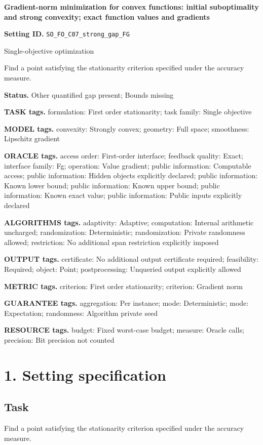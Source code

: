 \documentclass[10pt,a4paper]{article}
\begin{document}
\raggedright

{\LARGE\bfseries\sffamily\color{AtlasNavy} Gradient-norm minimization for convex functions: initial suboptimality and strong convexity; exact function values and gradients\par}\vspace{5pt}
\textbf{Setting ID.} \texttt{SO\_\allowbreak{}FO\_\allowbreak{}C07\_\allowbreak{}strong\_\allowbreak{}gap\_\allowbreak{}FG}

Single-objective optimization

Find a point satisfying the stationarity criterion specified under the accuracy measure.

\textbf{Status.} Other quantified gap present; Bounds missing

\textbf{TASK tags.} formulation: First order stationarity; task family: Single objective

\textbf{MODEL tags.} convexity: Strongly convex; geometry: Full space; smoothness: Lipschitz gradient

\textbf{ORACLE tags.} access order: First-order interface; feedback quality: Exact; interface family: Fg; operation: Value gradient; public information: Computable access; public information: Hidden objects explicitly declared; public information: Known lower bound; public information: Known upper bound; public information: Known exact value; public information: Public inputs explicitly declared

\textbf{ALGORITHMS tags.} adaptivity: Adaptive; computation: Internal arithmetic uncharged; randomization: Deterministic; randomization: Private randomness allowed; restriction: No additional span restriction explicitly imposed

\textbf{OUTPUT tags.} certificate: No additional output certificate required; feasibility: Required; object: Point; postprocessing: Unqueried output explicitly allowed

\textbf{METRIC tags.} criterion: First order stationarity; criterion: Gradient norm

\textbf{GUARANTEE tags.} aggregation: Per instance; mode: Deterministic; mode: Expectation; randomness: Algorithm private seed

\textbf{RESOURCE tags.} budget: Fixed worst-case budget; measure: Oracle calls; precision: Bit precision not counted

\section{1. Setting specification}
\subsection{Task}
Find a point satisfying the stationarity criterion specified under the accuracy measure.
\end{document}
